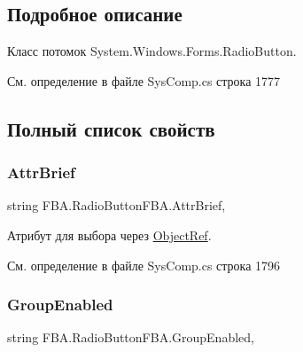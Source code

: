 \subsection{Подробное описание}
Класс потомок System.\+Windows.\+Forms.\+Radio\+Button. 



См. определение в файле Sys\+Comp.\+cs строка 1777



\subsection{Полный список свойств}
\mbox{\label{class_f_b_a_1_1_radio_button_f_b_a_af5be9c53f9b8c569314b3b96d8f0fb74}} 
\subsubsection{\texorpdfstring{Attr\+Brief}{AttrBrief}}
{\footnotesize\ttfamily string F\+B\+A.\+Radio\+Button\+F\+B\+A.\+Attr\+Brief\hspace{0.3cm}{\ttfamily [get]}, {\ttfamily [set]}}



Атрибут для выбора через \mbox{\hyperlink{class_f_b_a_1_1_object_ref}{Object\+Ref}}. ~\newline




См. определение в файле Sys\+Comp.\+cs строка 1796

\mbox{\label{class_f_b_a_1_1_radio_button_f_b_a_affd6df9f3e666815be9f52122269af10}} 
\subsubsection{\texorpdfstring{Group\+Enabled}{GroupEnabled}}
{\footnotesize\ttfamily string F\+B\+A.\+Radio\+Button\+F\+B\+A.\+Group\+Enabled\hspace{0.3cm}{\ttfamily [get]}, {\ttfamily [set]}}



